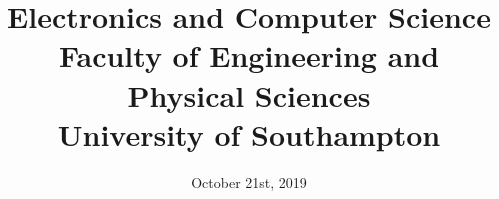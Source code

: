 \documentclass{src/ecsgdp}
\begin{document}
\frontmatter
\title      {Electronics and Computer Science\\Faculty of Engineering and Physical Sciences\\University of Southampton}
\addresses  {\groupname\\\deptname\\\univname}
\date       {October 21st, 2019}
\subject    {Automatically Generated Cyber Security Compliance Engine}
\keywords   {}
\maketitle

\begin{abstract}

\end{abstract}

\tableofcontents
\listoffigures
\listoftables
\lstlistoflistings



\mainmatter







\backmatter



\appendix

\end{document}
